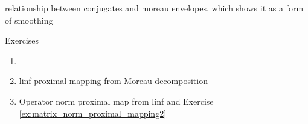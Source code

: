 relationship between conjugates and moreau envelopes, which shows it as a form
of smoothing 

\begin{xcb}{Exercises}
\begin{enumerate}[label=\thechapter.\arabic*]
\settowidth{\leftmargini}{0.00.\hskip\labelsep}
\item \label{ex:conjugates_smoothness}

\item linf proximal mapping from Moreau decomposition

\item Operator norm proximal map from linf and Exercise
  \ref{ex:matrix_norm_proximal_mapping2}   

\end{enumerate}
\end{xcb}
